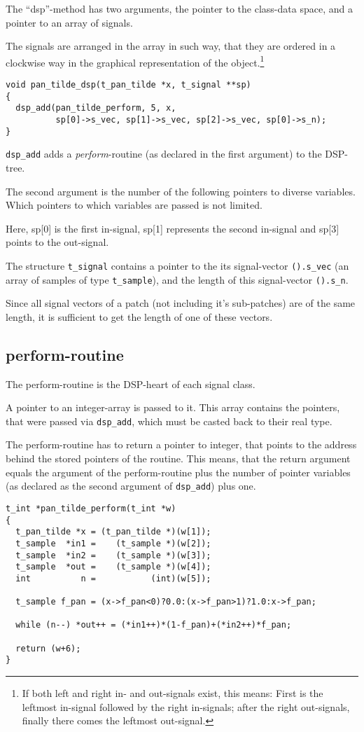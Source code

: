 \documentclass[12pt, a4paper,english,titlepage]{article}
\begin{document}
The ``dsp''-method has two arguments, the pointer to the class-data space, and 
a pointer to an array of signals.

The signals are arranged in the array in such way,
that they are ordered in a clockwise way in the graphical representation of the
object.\footnote{
If both left and right in- and out-signals exist, this means:
First is the leftmost in-signal followed by the right in-signals;
after the right out-signals, finally there comes the leftmost out-signal.}

\begin{verbatim}
void pan_tilde_dsp(t_pan_tilde *x, t_signal **sp)
{
  dsp_add(pan_tilde_perform, 5, x,
          sp[0]->s_vec, sp[1]->s_vec, sp[2]->s_vec, sp[0]->s_n);
}
\end{verbatim}

\verb+dsp_add+ adds a {\em perform}-routine (as declared in the first argument)
to the DSP-tree.

The second argument is the number of the following pointers to diverse variables.
Which pointers to which variables are passed is not limited.

Here, sp[0] is the first in-signal, sp[1] represents the second in-signal and
sp[3] points to the out-signal.

The structure \verb+t_signal+ contains a pointer to the
its signal-vector \verb+().s_vec+ (an array of samples of type  \verb+t_sample+),
and the length of this signal-vector \verb+().s_n+.

Since all signal vectors of a patch (not including it's sub-patches) are of the same length,
it is sufficient to get the length of one of these vectors.

\subsection{perform-routine}
The perform-routine is the DSP-heart of each signal class.

A pointer to an integer-array is passed to it.
This array contains the pointers, that were passed via \verb+dsp_add+,
which must be casted back to their real type.

The perform-routine has to return a pointer to integer,
that points to the address behind the stored pointers of the routine.
This means, that the return argument equals the
argument of the perform-routine plus
the number of pointer variables (as declared as the second argument
of \verb+dsp_add+) plus one.

\begin{verbatim}
t_int *pan_tilde_perform(t_int *w)
{
  t_pan_tilde *x = (t_pan_tilde *)(w[1]);
  t_sample  *in1 =    (t_sample *)(w[2]);
  t_sample  *in2 =    (t_sample *)(w[3]);
  t_sample  *out =    (t_sample *)(w[4]);
  int          n =           (int)(w[5]);

  t_sample f_pan = (x->f_pan<0)?0.0:(x->f_pan>1)?1.0:x->f_pan;

  while (n--) *out++ = (*in1++)*(1-f_pan)+(*in2++)*f_pan;

  return (w+6);
}
\end{verbatim}
\end{document}
